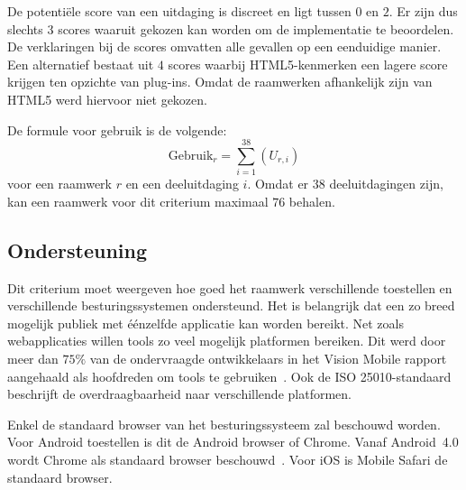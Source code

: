 De potentiële score van een uitdaging is discreet en ligt tussen $0$ en $2$.
Er zijn dus slechts $3$ scores waaruit gekozen kan worden om de implementatie te beoordelen.
De verklaringen bij de scores omvatten alle gevallen op een eenduidige manier.
Een alternatief bestaat uit $4$ scores waarbij HTML5-kenmerken een lagere score krijgen ten opzichte van plug-ins.
Omdat de raamwerken afhankelijk zijn van HTML5 werd hiervoor niet gekozen.

De formule voor gebruik is de volgende:
\begin{equation}
  \text{Gebruik}_r = \sum_{i=1}^{38}{\left(U_{r,i}\right)}
  \label{eq:gebruik}
\end{equation}
voor een raamwerk $r$ en een deeluitdaging $i$.
Omdat er $38$ deeluitdagingen zijn, kan een raamwerk voor dit criterium maximaal $76$ behalen.


\subsection{Ondersteuning}
\label{sec:vergelijking-ondersteuning}
Dit criterium moet weergeven hoe goed het raamwerk verschillende toestellen en verschillende besturingssystemen ondersteund.
Het is belangrijk dat een zo breed mogelijk publiek met éénzelfde applicatie kan worden bereikt.
Net zoals webapplicaties willen  tools zo veel mogelijk platformen bereiken.
Dit werd door meer dan $75\%$ van de ondervraagde ontwikkelaars in het Vision Mobile rapport aangehaald als hoofdreden om  tools te gebruiken~\cite{Mobile2012}. 
Ook de ISO 25010-standaard beschrijft de overdraagbaarheid naar verschillende platformen.

Enkel de standaard browser van het besturingssysteem zal beschouwd worden.
Voor Android toestellen is dit de Android browser of Chrome.  
Vanaf Android~4.0 wordt Chrome als standaard browser beschouwd~\cite{Wimberly2008}.
Voor iOS is Mobile Safari de standaard browser.

